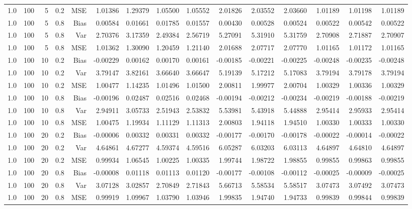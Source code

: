\begin{table}[!htbp]
\begin{tabular}{lrrrrrrrrrrrrrr}
1.0 & 100 &  5 & 0.2 & MSE & 1.01386 & 1.29379 & 1.05500 & 1.05552 & 2.01826 & 2.03552 & 2.03660 & 1.01189 & 1.01198 & 1.01189 \\
1.0 & 100 &  5 & 0.8 & Bias & 0.00584 & 0.01661 & 0.01785 & 0.01557 & 0.00430 & 0.00528 & 0.00524 & 0.00522 & 0.00542 & 0.00522 \\
1.0 & 100 &  5 & 0.8 & Var & 2.70376 & 3.17359 & 2.49384 & 2.56719 & 5.27091 & 5.31910 & 5.31759 & 2.70908 & 2.71887 & 2.70907 \\
1.0 & 100 &  5 & 0.8 & MSE & 1.01362 & 1.30090 & 1.20459 & 1.21140 & 2.01688 & 2.07717 & 2.07770 & 1.01165 & 1.01172 & 1.01165 \\
1.0 & 100 & 10 & 0.2 & Bias & -0.00229 & 0.00162 & 0.00170 & 0.00161 & -0.00185 & -0.00221 & -0.00225 & -0.00248 & -0.00235 & -0.00248 \\
1.0 & 100 & 10 & 0.2 & Var & 3.79147 & 3.82161 & 3.66640 & 3.66647 & 5.19139 & 5.17212 & 5.17083 & 3.79194 & 3.79178 & 3.79194 \\
1.0 & 100 & 10 & 0.2 & MSE & 1.00477 & 1.14235 & 1.01496 & 1.01500 & 2.00811 & 1.99977 & 2.00704 & 1.00329 & 1.00336 & 1.00329 \\
1.0 & 100 & 10 & 0.8 & Bias & -0.00196 & 0.02487 & 0.02516 & 0.02468 & -0.00194 & -0.00212 & -0.00234 & -0.00219 & -0.00188 & -0.00219 \\
1.0 & 100 & 10 & 0.8 & Var & 2.94911 & 3.05733 & 2.51943 & 2.53832 & 5.53981 & 5.43918 & 5.44888 & 2.95414 & 2.95933 & 2.95414 \\
1.0 & 100 & 10 & 0.8 & MSE & 1.00475 & 1.19934 & 1.11129 & 1.11313 & 2.00803 & 1.94118 & 1.94510 & 1.00330 & 1.00333 & 1.00330 \\
1.0 & 100 & 20 & 0.2 & Bias & -0.00006 & 0.00332 & 0.00331 & 0.00332 & -0.00177 & -0.00170 & -0.00178 & -0.00022 & -0.00014 & -0.00022 \\
1.0 & 100 & 20 & 0.2 & Var & 4.64861 & 4.67277 & 4.59374 & 4.59516 & 6.05287 & 6.03203 & 6.03113 & 4.64897 & 4.64810 & 4.64897 \\
1.0 & 100 & 20 & 0.2 & MSE & 0.99934 & 1.06545 & 1.00225 & 1.00335 & 1.99744 & 1.98722 & 1.98855 & 0.99855 & 0.99863 & 0.99855 \\
1.0 & 100 & 20 & 0.8 & Bias & -0.00008 & 0.01118 & 0.01113 & 0.01120 & -0.00177 & -0.00108 & -0.00112 & -0.00025 & -0.00009 & -0.00025 \\
1.0 & 100 & 20 & 0.8 & Var & 3.07128 & 3.02857 & 2.70849 & 2.71843 & 5.66713 & 5.58534 & 5.58517 & 3.07473 & 3.07492 & 3.07473 \\
1.0 & 100 & 20 & 0.8 & MSE & 0.99919 & 1.09967 & 1.03790 & 1.03946 & 1.99835 & 1.94740 & 1.94733 & 0.99839 & 0.99844 & 0.99839 \\

\end{tabular}
\end{table}
